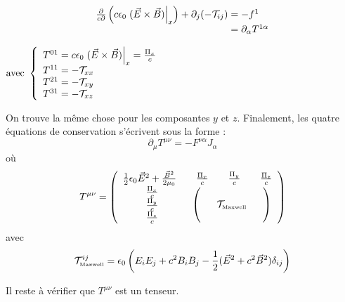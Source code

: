 \begin{minipage}{0.45\linewidth}
$$
	\begin{array}{r@{\;}l}
		\frac{\partial}{c\partial}\left(c\epsilon_0\left.(\vec{E}\times\vec{B})\right|_x\right)+\partial_j(-\mathcal{T}_{ij})&=-f^1\\
			&=\partial_{\alpha}T^{1\alpha}
	\end{array}
$$
\end{minipage}\hspace{0.05\linewidth}
\begin{minipage}{0.40\linewidth}
$
	\text{avec }\left\{ \begin{array}{r@{\;}l}
		T^{01}&=c\epsilon_0\left.(\vec{E}\times\vec{B})\right|_x=\frac{\Pi_x}{c}\\
		T^{11}&=-\mathcal{T}_{xx}\\
		T^{21}&=-\mathcal{T}_{xy}\\
		T^{31}&=-\mathcal{T}_{xz}\\
	\end{array} \right.
$
\end{minipage}

On trouve la même chose pour les composantes $y$ et $z$. Finalement, les quatre équations de conservation s'écrivent sous la forme :
$$
	\boxed{\partial_\mu T^{\mu\nu}=-F^{\nu\alpha}J_{\alpha}}
$$
où
$$
	T^{\mu\nu}=	\left( \begin{array}{cccc@{\/}}
		\frac{1}{2}\epsilon_0\vec{E}^2+\frac{\vec{B}^2}{2\mu_0} \kern 5pt & \kern 5pt \frac{\Pi_x}{c}  \kern 5pt & \kern 5pt  \frac{\Pi_y}{c}  \kern 5pt & \kern 5pt  \frac{\Pi_z}{c} \kern 5pt \\
		\begin{array}{c}
			\frac{\Pi_x}{c}\\
			\frac{\Pi_y}{c}\\
			\frac{\Pi_z}{c}
		\end{array} & \multicolumn{3}{c}{\left( \begin{array}{c}
			\\
			\kern 0.4cm \mathcal{T}_{\text{\tiny Maxwell}} \kern 0.4cm\\
			\\
		\end{array} \right)}
	\end{array} \right)
$$
avec
$$\mathcal{T}^{ij}_{\text{\tiny Maxwell}}=\epsilon_0\left(E_iE_j+c^2B_iB_j-\frac{1}{2}(\vec{E}^2+c^2\vec{B}^2)\delta_{ij}\right)$$

Il reste à vérifier que $T^{\mu\nu}$ est un tenseur.

